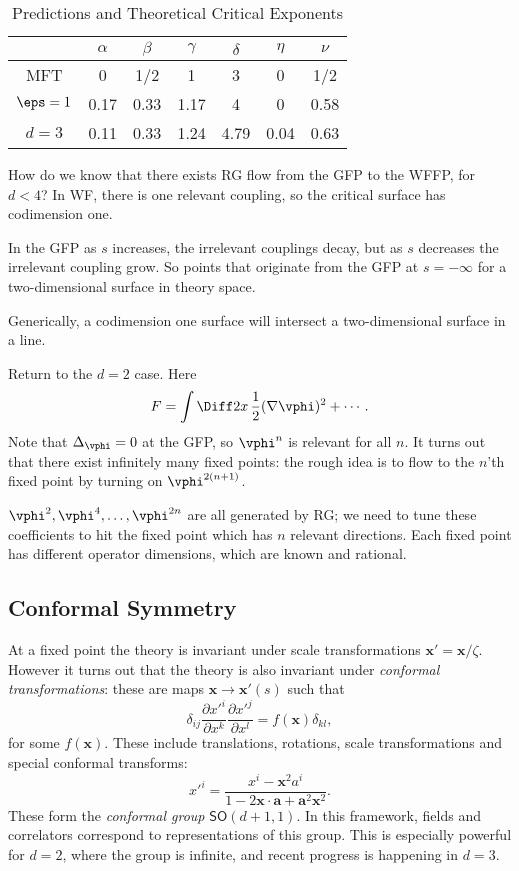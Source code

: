 \documentclass[12pt]{article}
\begin{document}

\begin{table}[ht]
\centering
\begin{tabular}{c|cccccc}
	& $\alpha$ & $\beta$ & $\gamma$ & $\delta$ & $\eta$ & $\nu$ \\
\hline
	MFT & 0 & 1/2 & 1 & 3 & 0 & 1/2 \\
	$\eps = 1$ & 0.17 & 0.33 & 1.17 & 4 & 0 & 0.58 \\
	$d = 3$ & 0.11 & 0.33 & 1.24 & 4.79 & 0.04 & 0.63
\end{tabular}
\caption{Predictions and Theoretical Critical Exponents}
\end{table}

How do we know that there exists RG flow from the GFP to the WFFP, for $d < 4$? In WF, there is one relevant coupling, so the critical surface has codimension one.

In the GFP as $s$ increases, the irrelevant couplings decay, but as $s$ decreases the irrelevant coupling grow. So points that originate from the GFP at $s = -\infty$ for a two-dimensional surface in theory space.

Generically, a codimension one surface will intersect a two-dimensional surface in a line.

Return to the $d = 2$ case. Here
\[
F = \int \Diff 2 x \, \frac 12 (\nabla \vphi)^2 + \cdots.
\]
Note that $\Delta_\vphi = 0$ at the GFP, so $\vphi^n$ is relevant for all $n$. It turns out that there exist infinitely many fixed points: the rough idea is to flow to the $n$'th fixed point by turning on $\vphi^{2(n+1)}$.

$\vphi^2, \vphi^{4}, \ldots, \vphi^{2n}$ are all generated by RG; we need to tune these coefficients to hit the fixed point which has $n$ relevant directions. Each fixed point has different operator dimensions, which are known and rational.

\subsection{Conformal Symmetry}%
\label{sub:cs}

At a fixed point the theory is invariant under scale transformations $\mathbf{x}' = \mathbf{x}/\zeta$. However it turns out that the theory is also invariant under \emph{conformal transformations}: these are maps $\mathbf{x} \to \mathbf{x}'(s)$ such that
\[
	\delta_{ij} \frac{\partial {x'}^i}{\partial x^k} \frac{\partial {x'}^j}{\partial x^l} = f(\mathbf{x}) \delta_{kl},
\]
for some $f(\mathbf{x})$. These include translations, rotations, scale transformations and special conformal transforms:
\[
	{x'}^i = \frac{x^i - \mathbf{x}^2 a^i}{1 - 2 \mathbf{x} \cdot \mathbf{a} + \mathbf{a}^2 \mathbf{x}^2}.
\]
These form the \emph{conformal group} $\mathsf{SO}(d+1,1)$. In this framework, fields and correlators correspond to representations of this group. This is especially powerful for $d = 2$, where the group is infinite, and recent progress is happening in $d = 3$.
\end{document}
